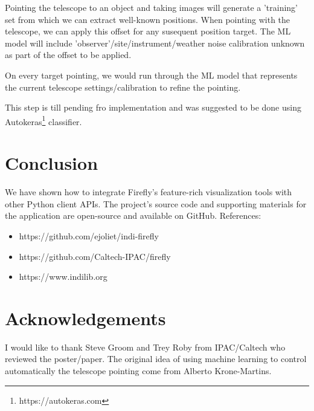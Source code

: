 \documentclass[11pt,twoside]{article}
\begin{document}
Pointing the telescope to an object and taking images will generate a 'training' set from which we can extract well-known positions. When pointing with the telescope, we can apply this offset for any susequent position target.
The ML model will include 'observer'/site/instrument/weather noise calibration unknown as part of the offset to be applied.

On every target pointing, we would run through the ML model that represents the current telescope settings/calibration to refine the pointing.

This step is till pending fro implementation and was suggested to be done using Autokeras\footnote{https://autokeras.com} classifier.

\section{Conclusion}

We have shown how to integrate Firefly's feature-rich visualization tools with other Python client APIs.
The project's source code and supporting materials for the application are open-source and available on GitHub.
References:
\begin{itemize}
  \item https://github.com/ejoliet/indi-firefly
  \item https://github.com/Caltech-IPAC/firefly
  \item https://www.indilib.org
\end{itemize}



\section{Acknowledgements}

I would like to thank Steve Groom and Trey Roby from IPAC/Caltech who reviewed the poster/paper.
The original idea of using machine learning to control automatically the telescope pointing come from Alberto Krone-Martins.

\clearpage %

\end{document}
